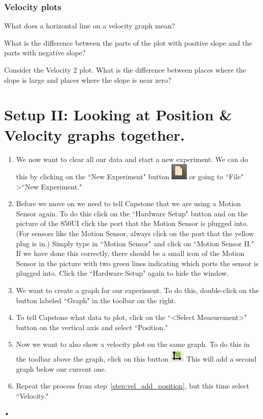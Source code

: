 \documentclass[main.tex]{subfiles}
\begin{document}
\subsubsection*{Velocity plots}
\begin{question}
What does a horizontal line on a velocity graph mean?
\end{question}
\begin{question}
What is the difference between the parts of the plot with positive slope and the parts with negative slope?
\end{question}
\begin{question}
Consider the Velocity 2 plot. What is the difference between places where the slope is large and places where the slope is near zero?
\end{question}

\section{Setup II: Looking at Position \& Velocity graphs together.}
\begin{enumerate}
\item
We now want to clear all our data and start a new experiment. We can do this by clicking on the ``New Experiment" button \includegraphics{New_Experiment} or going to ``File" \textgreater ``New Experiment."
\item
Before we move on we need to tell Capstone that we are using a Motion Sensor again. To do this click on the ``Hardware Setup" button and on the picture of the 850UI click the port that the Motion Sensor is plugged into. (For sensors like the Motion Sensor, always click on the port that the yellow plug is in.) Simply type in ``Motion Sensor" and click on ``Motion Sensor II." If we have done this correctly, there should be a small icon of the Motion Sensor in the picture with two green lines indicating which ports the sensor is plugged into. Click the ``Hardware Setup" again to hide the window.
\item
We want to create a graph for our experiment. To do this, double-click on the button labeled ``Graph" in the toolbar on the right.
\item\label{step:vel_add_position}
To tell Capstone what data to plot, click on the ``\textless Select Measurement\textgreater" button on the vertical axis and select ``Position."
\item
Now we want to also show a velocity plot on the same graph. To do this in the toolbar above the graph, click on this button \includegraphics{Add_New_Plot}
 This will add a second graph below our current one.
\item
Repeat the process from step~\ref{step:vel_add_position}, but this time select ``Velocity."
\end{enumerate}•
\end{document}
